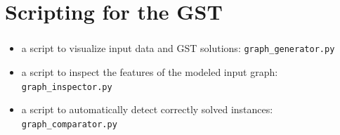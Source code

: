 \documentclass{beamer}
\begin{document}
\section{Scripting for the GST}\label{14}
\begin{frame}
\frametitle{\textsc{}}
\begin{itemize}
\item a script to visualize input data and GST solutions: \texttt{graph\_generator.py}
\item a script to inspect the features of the modeled input graph: \texttt{graph\_inspector.py}
\item a script to automatically detect correctly solved instances: \texttt{graph\_comparator.py}
\end{itemize}
\end{frame}
\end{document}
